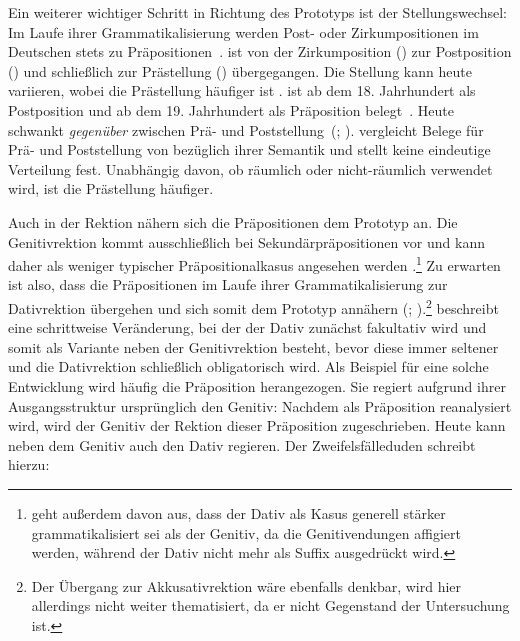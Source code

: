 Ein weiterer wichtiger Schritt in Richtung des Prototyps ist der Stellungswechsel:  
Im Laufe ihrer Grammatikalisierung werden Post- oder Zirkumpositionen im Deutschen stets zu Pr{\"a}positionen~\citep[s.][35]{Lehmann1992}. 
ist von der Zirkumposition () zur Postposition () und schließlich zur Prästellung () übergegangen. 
Die Stellung kann heute variieren, wobei die Prästellung häufiger ist \citep[s.][223]{DiMeola2011}. 
 ist ab dem 18. Jahrhundert als Postposition und ab dem 19. Jahrhundert als Pr{\"a}position belegt~\citep[35]{Lehmann1992}. 
Heute schwankt \textit{gegen{\"u}ber} zwischen Pr{\"a}- und Poststellung~(\citealp[s.][69--70]{DiMeola2000}; \citealp[{\S}903]{Duden2016}). 
\citet[198]{DiMeola2000} vergleicht Belege für Prä- und Poststellung von  bezüglich ihrer Semantik und stellt keine eindeutige Verteilung fest. 
Unabhängig davon, ob  räumlich oder nicht-räumlich verwendet wird, ist die Prästellung häufiger.

Auch in der Rektion nähern sich die Präpositionen dem Prototyp an. 
Die Genitivrektion kommt ausschließlich bei Sekundärpräpositionen vor und kann daher als weniger typischer Präpositionalkasus angesehen werden \citep[s.][32--34]{Lindqvist1994}.\footnote{\citet[303]{Lehmann.1985} geht außerdem davon aus, dass der Dativ als Kasus generell st{\"a}rker grammatikalisiert sei als der Genitiv, da die Genitivendungen affigiert werden, w{\"a}hrend der Dativ nicht mehr als Suffix ausgedr{\"u}ckt wird.}
Zu erwarten ist also, dass die Präpositionen im Laufe ihrer Grammatikalisierung zur Dativrektion übergehen und sich somit dem Prototyp annähern (\citealp[s.][38]{Lehmann1992}; \citealp[95]{Szczepaniak2011}).\footnote{Der Übergang zur Akkusativrektion wäre ebenfalls denkbar, wird hier allerdings nicht weiter thematisiert, da er nicht Gegenstand der Untersuchung ist.} 
\citet[38--39]{Lindqvist1994} beschreibt eine schrittweise Ver{\"a}nderung, bei der der Dativ zun{\"a}chst fakultativ wird und somit als Variante neben der Genitivrektion besteht, bevor diese immer seltener und die Dativrektion schlie{\ss}lich obligatorisch wird.
Als Beispiel für eine solche Entwicklung wird häufig die Präposition herangezogen. 
Sie regiert aufgrund ihrer Ausgangsstruktur ursprünglich den Genitiv: Nachdem  als Präposition reanalysiert wird, wird der Genitiv der Rektion dieser Präposition zugeschrieben. 
Heute kann  neben dem Genitiv auch den Dativ regieren. 
Der Zweifelsfälleduden schreibt hierzu: 


